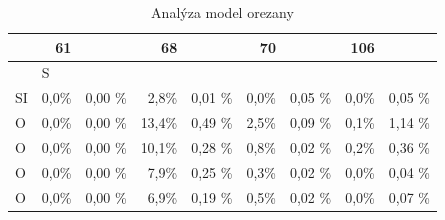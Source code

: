 \documentclass[
  digital, %
  table,   %
  lof,     %
  lot,     %
  oneside,
]{fithesis3}
\begin{document}
\begin{table}[htbp]
\caption{Analýza model orezany}
\begin{center}
\begin{tabular}{|l|r|r|r|r|r|r|r|r|}
\hline
 & 61 & \multicolumn{1}{l|}{} & 68 & \multicolumn{1}{l|}{} & 70 & \multicolumn{1}{l|}{} & 106 & \multicolumn{1}{l|}{} \\ \hline
 & \multicolumn{1}{l|}{S} &  \\
SI  & 0,0\% & 0,00 \% & 2,8\% & 0,01 \% & 0,0\% & 0,05 \% & 0,0\% & 0,05 \% \\ \hline
O & 0,0\% & 0,00 \% & 13,4\% & 0,49 \% & 2,5\% & 0,09 \% & 0,1\% & 1,14 \% \\ \hline
O & 0,0\% & 0,00 \% & 10,1\% & 0,28 \% & 0,8\% & 0,02 \% & 0,2\% & 0,36 \% \\ \hline
O & 0,0\% & 0,00 \% & 7,9\% & 0,25 \% & 0,3\% & 0,02 \% & 0,0\% & 0,04 \% \\ \hline
O & 0,0\% & 0,00 \% & 6,9\% & 0,19 \% & 0,5\% & 0,02 \% & 0,0\% & 0,07 \% \\ \hline
\end{tabular}
\end{center}
\label{si_model_orezany_MPA}
\end{table}
\end{document}
